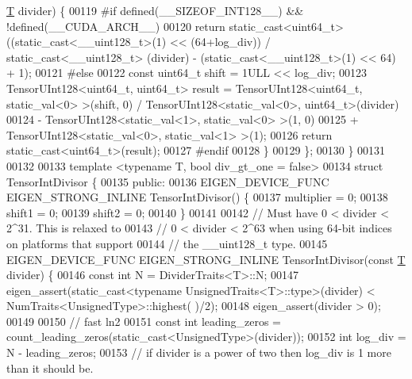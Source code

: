 \begin{DoxyCode}
      \hyperlink{group___sparse_core___module_class_eigen_1_1_triplet}{T} divider) \{
00119 \textcolor{preprocessor}{#if defined(\_\_SIZEOF\_INT128\_\_) && !defined(\_\_CUDA\_ARCH\_\_)}
00120       \textcolor{keywordflow}{return} \textcolor{keyword}{static\_cast<}uint64\_t\textcolor{keyword}{>}((\textcolor{keyword}{static\_cast<}\_\_uint128\_t\textcolor{keyword}{>}(1) << (64+log\_div)) / static\_cast<\_\_uint128\_t>
      (divider) - (\textcolor{keyword}{static\_cast<}\_\_uint128\_t\textcolor{keyword}{>}(1) << 64) + 1);
00121 \textcolor{preprocessor}{#else}
00122       \textcolor{keyword}{const} uint64\_t shift = 1ULL << log\_div;
00123       TensorUInt128<uint64\_t, uint64\_t> result = TensorUInt128<uint64\_t, static\_val<0> >(shift, 0) / 
      TensorUInt128<static\_val<0>, uint64\_t>(divider)
00124                                                - TensorUInt128<static\_val<1>, static\_val<0> >(1, 0)
00125                                                + TensorUInt128<static\_val<0>, static\_val<1> >(1);
00126       \textcolor{keywordflow}{return} \textcolor{keyword}{static\_cast<}uint64\_t\textcolor{keyword}{>}(result);
00127 \textcolor{preprocessor}{#endif}
00128     \}
00129   \};
00130 \}
00131 
00132 
00133 \textcolor{keyword}{template} <\textcolor{keyword}{typename} T, \textcolor{keywordtype}{bool} div\_gt\_one = false>
00134 \textcolor{keyword}{struct }TensorIntDivisor \{
00135  \textcolor{keyword}{public}:
00136   EIGEN\_DEVICE\_FUNC EIGEN\_STRONG\_INLINE TensorIntDivisor() \{
00137     multiplier = 0;
00138     shift1 = 0;
00139     shift2 = 0;
00140   \}
00141 
00142   \textcolor{comment}{// Must have 0 < divider < 2^31. This is relaxed to}
00143   \textcolor{comment}{// 0 < divider < 2^63 when using 64-bit indices on platforms that support}
00144   \textcolor{comment}{// the \_\_uint128\_t type.}
00145   EIGEN\_DEVICE\_FUNC EIGEN\_STRONG\_INLINE TensorIntDivisor(\textcolor{keyword}{const} \hyperlink{group___sparse_core___module_class_eigen_1_1_triplet}{T} divider) \{
00146     \textcolor{keyword}{const} \textcolor{keywordtype}{int} N = DividerTraits<T>::N;
00147     eigen\_assert(\textcolor{keyword}{static\_cast<}typename UnsignedTraits<T>::type\textcolor{keyword}{>}(divider) < NumTraits<UnsignedType>::highest(
      )/2);
00148     eigen\_assert(divider > 0);
00149 
00150     \textcolor{comment}{// fast ln2}
00151     \textcolor{keyword}{const} \textcolor{keywordtype}{int} leading\_zeros = count\_leading\_zeros(static\_cast<UnsignedType>(divider));
00152     \textcolor{keywordtype}{int} log\_div = N - leading\_zeros;
00153     \textcolor{comment}{// if divider is a power of two then log\_div is 1 more than it should be.}

\end{DoxyCode}
